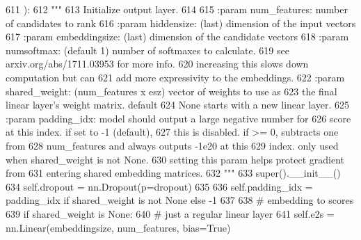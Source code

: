 \begin{DoxyCode}
611     ):
612         \textcolor{stringliteral}{"""}
613 \textcolor{stringliteral}{        Initialize output layer.}
614 \textcolor{stringliteral}{}
615 \textcolor{stringliteral}{        :param num\_features:  number of candidates to rank}
616 \textcolor{stringliteral}{        :param hiddensize:    (last) dimension of the input vectors}
617 \textcolor{stringliteral}{        :param embeddingsize: (last) dimension of the candidate vectors}
618 \textcolor{stringliteral}{        :param numsoftmax:   (default 1) number of softmaxes to calculate.}
619 \textcolor{stringliteral}{                              see arxiv.org/abs/1711.03953 for more info.}
620 \textcolor{stringliteral}{                              increasing this slows down computation but can}
621 \textcolor{stringliteral}{                              add more expressivity to the embeddings.}
622 \textcolor{stringliteral}{        :param shared\_weight: (num\_features x esz) vector of weights to use as}
623 \textcolor{stringliteral}{                              the final linear layer's weight matrix. default}
624 \textcolor{stringliteral}{                              None starts with a new linear layer.}
625 \textcolor{stringliteral}{        :param padding\_idx:   model should output a large negative number for}
626 \textcolor{stringliteral}{                              score at this index. if set to -1 (default),}
627 \textcolor{stringliteral}{                              this is disabled. if >= 0, subtracts one from}
628 \textcolor{stringliteral}{                              num\_features and always outputs -1e20 at this}
629 \textcolor{stringliteral}{                              index. only used when shared\_weight is not None.}
630 \textcolor{stringliteral}{                              setting this param helps protect gradient from}
631 \textcolor{stringliteral}{                              entering shared embedding matrices.}
632 \textcolor{stringliteral}{        """}
633         super().\_\_init\_\_()
634         self.dropout = nn.Dropout(p=dropout)
635 
636         self.padding\_idx = padding\_idx \textcolor{keywordflow}{if} shared\_weight \textcolor{keywordflow}{is} \textcolor{keywordflow}{not} \textcolor{keywordtype}{None} \textcolor{keywordflow}{else} -1
637 
638         \textcolor{comment}{# embedding to scores}
639         \textcolor{keywordflow}{if} shared\_weight \textcolor{keywordflow}{is} \textcolor{keywordtype}{None}:
640             \textcolor{comment}{# just a regular linear layer}
641             self.e2s = nn.Linear(embeddingsize, num\_features, bias=\textcolor{keyword}{True})

\end{DoxyCode}
